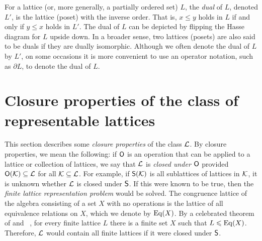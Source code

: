 For a lattice (or, more generally, a partially ordered set) 
$L$, the \emph{dual} of $L$, denoted
$L'$, is the lattice (poset) with the inverse order. That is, 
$x \leq y$ holds in $L$ if and only if $y \leq x$ holds in $L'$. 
The dual of $L$ can be depicted by flipping the Hasse diagram
for $L$ upside down. 
In a broader sense, two lattices (posets) are also said to be duals if they are
dually isomorphic.
Although we often denote the dual of $L$ by $L'$, on some occasions it is more
convenient to use an operator notation, such as $\partial L$, to denote the dual of
$L$. 


\section{Closure properties of the class of representable lattices}
\label{sec:clos-prop-class}
This section describes some
\emph{closure properties}
of the class $\mathcal{L}$. %
By closure properties, we mean the following: if $\mathsf{O}$ is an operation that can
be applied to a lattice or collection of lattices, we say that $\mathcal{L}$ is
\emph{closed under $\mathsf{O}$} provided $\mathsf{O}(\mathcal{K}) \subseteq \mathcal{L}$ for all 
$\mathcal{K}\subseteq \mathcal{L}$. For example, if 
$\mathsf{S}(\mathcal{K})$ is all sublattices of lattices in $\mathcal{K}$, 
it is unknown whether $\mathcal{L}$ is closed under $\mathsf{S}$.  
If this were known to be true, then the 
\emph{finite lattice representation problem} would be solved.
The congruence lattice of the algebra consisting of a
set $X$ with no operations is the lattice of all equivalence relations on $X$,
which we denote by $\operatorname{Eq}(X)$.
By a celebrated theorem of \Pudlak and \Tuma~\cite{Pudlak:1980}, for every finite
lattice $L$ there is a finite set $X$ such that $L\leqslant \operatorname{Eq}(X)$.  Therefore, $\mathcal{L}$
would contain all finite lattices if it were closed under $\mathsf{S}$.


